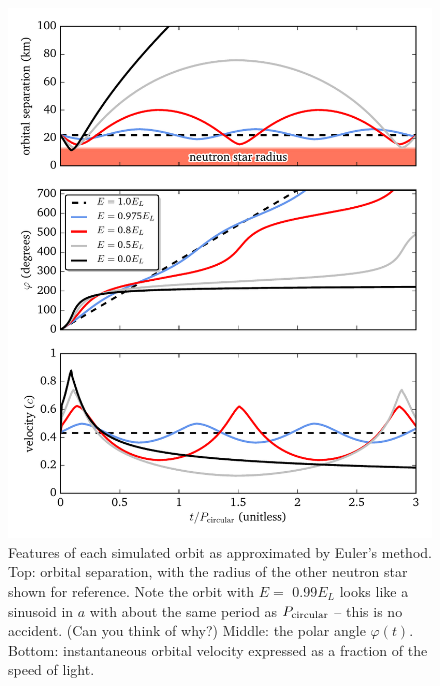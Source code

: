 \documentclass[11pt]{article}
\begin{document}
\begin{figure}[!h]
\centering
\includegraphics[scale=1]{stable_orbit/orbit_parameters.pdf}
\caption{\label{fig:simulated_parameters} Features of each simulated orbit as approximated by Euler's method. Top: orbital separation, with the radius of the other neutron star shown for reference. Note the orbit with $E=$ 0.99$E_L$ looks like a sinusoid in $a$ with about the same period as $P_{\rm circular}$ -- this is no accident. (Can you think of why?) Middle: the polar angle $\varphi(t)$. Bottom: instantaneous orbital velocity expressed as a fraction of the speed of light.}
\end{figure}
\end{document}
